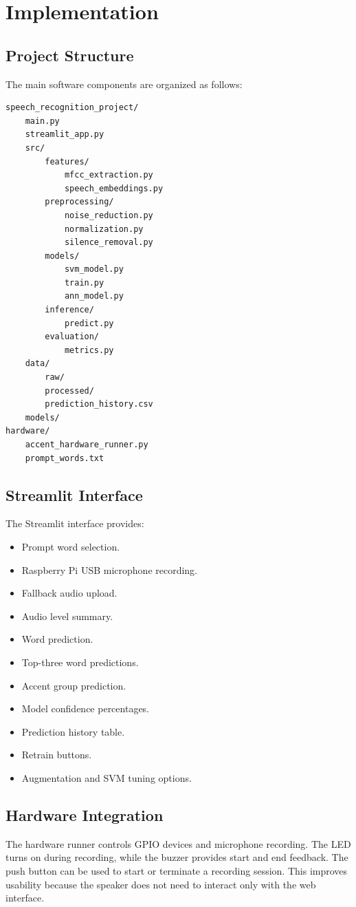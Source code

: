\documentclass[12pt,a4paper]{report}
\begin{document}
\chapter{Implementation}

\section{Project Structure}
The main software components are organized as follows:

\begin{verbatim}
speech_recognition_project/
    main.py
    streamlit_app.py
    src/
        features/
            mfcc_extraction.py
            speech_embeddings.py
        preprocessing/
            noise_reduction.py
            normalization.py
            silence_removal.py
        models/
            svm_model.py
            train.py
            ann_model.py
        inference/
            predict.py
        evaluation/
            metrics.py
    data/
        raw/
        processed/
        prediction_history.csv
    models/
hardware/
    accent_hardware_runner.py
    prompt_words.txt
\end{verbatim}

\section{Streamlit Interface}
The Streamlit interface provides:

\begin{itemize}
    \item Prompt word selection.
    \item Raspberry Pi USB microphone recording.
    \item Fallback audio upload.
    \item Audio level summary.
    \item Word prediction.
    \item Top-three word predictions.
    \item Accent group prediction.
    \item Model confidence percentages.
    \item Prediction history table.
    \item Retrain buttons.
    \item Augmentation and SVM tuning options.
\end{itemize}

\section{Hardware Integration}
The hardware runner controls GPIO devices and microphone recording. The LED turns on during recording, while the buzzer provides start and end feedback. The push button can be used to start or terminate a recording session. This improves usability because the speaker does not need to interact only with the web interface.
\end{document}
